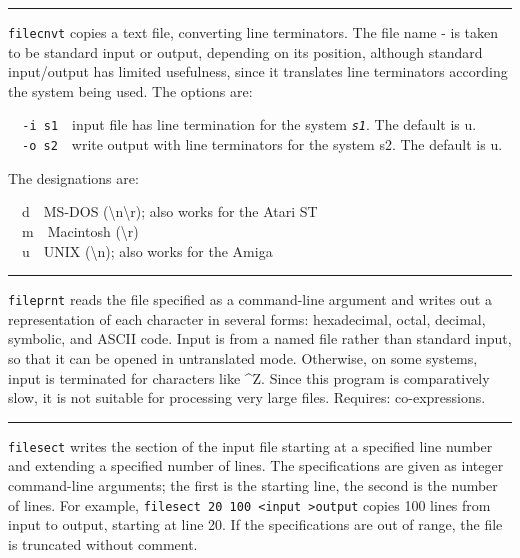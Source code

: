{{{{{\vspace{0.25cm}\hrule{}

\texttt{filecnvt} copies a text file, converting line terminators. The
file name {\textquotedbl}-{\textquotedbl} is taken to be standard input
or output, depending on its position, although standard input/output
has limited usefulness, since it translates line terminators according
the system being used. The options are:

\texttt{\ \ {}-i s1}\ \ input file has line termination for the system
\texttt{\textit{s1}}. The default is
{\textquotedbl}u{\textquotedbl}.\\
\ \ \texttt{{}-o s2}\ \ write output with line terminators for the
system s2. The default is {\textquotedbl}u{\textquotedbl}.

The designations are:

\ \ d\ \ MS-DOS
({\textquotedbl}{\textbackslash}n{\textbackslash}r{\textquotedbl});
also works for the Atari ST\\
\ \ m\ \ Macintosh
({\textquotedbl}{\textbackslash}r{\textquotedbl})\\
\ \ u\ \ UNIX ({\textquotedbl}{\textbackslash}n{\textquotedbl}); also
works for the Amiga

\vspace{0.25cm}\hrule{}

\texttt{fileprnt} reads the file specified as a command-line argument
and writes out a representation of each character in several forms:
hexadecimal, octal, decimal, symbolic, and ASCII code.
Input is from a named file rather than standard input, so that it can
be opened in untranslated mode. Otherwise, on some systems, input is
terminated for characters like \^{}Z. Since this program is
comparatively slow, it is not suitable for processing very large files.
Requires: co-expressions.

\vspace{0.25cm}\hrule{}

\texttt{filesect} writes the section of the input file starting at a
specified line number and extending a specified number of lines. The
specifications are given as integer command-line arguments; the first
is the starting line, the second is the number of lines. For example,
\texttt{filesect 20 100 {\textless}input {\textgreater}output} copies
100 lines from input to output, starting at line 20. If the
specifications are out of range, the file is truncated without comment.

}}}}}
